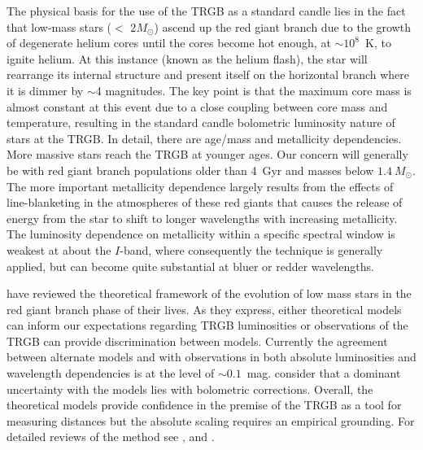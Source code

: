 \documentclass[twocolumn]{aastex62}
\begin{document}
The physical basis for the use of the TRGB as a standard candle lies in the fact that low-mass stars ($<$ 2$M_\odot$) ascend up the red giant branch due to the growth of degenerate helium cores until the cores become hot enough, at $\sim 10^8$~K, to ignite helium. At this instance (known as the helium flash), the star will rearrange its internal structure and present itself on the horizontal branch where it is dimmer by $\sim$4 magnitudes. The key point is that the maximum core mass is almost constant at this event due to a close coupling between core mass and temperature, resulting in the standard candle bolometric luminosity nature of stars at the TRGB. In detail, there are age/mass and metallicity dependencies. More massive stars reach the TRGB at younger ages. Our concern will generally be with red giant branch populations older than 4~Gyr and masses below $1.4~M_{\odot}$.  The more important metallicity dependence largely results from the effects of line-blanketing in the atmospheres of these red giants that causes the release of energy from the star to shift to longer wavelengths with increasing metallicity. The luminosity dependence on metallicity within a specific spectral window is weakest at about the $I$-band, where consequently the technique is generally applied, but can become quite substantial at bluer or redder wavelengths. 



\citet{2017A&A...606A..33S} have reviewed the theoretical framework of the evolution of low mass stars in the red giant branch phase of their lives.  As they express, either theoretical models can inform our expectations regarding TRGB luminosities or observations of the TRGB can provide discrimination between models.  Currently the agreement between alternate models and with observations in both absolute luminosities and wavelength dependencies is at the level of $\sim 0.1$~mag.  \citet{2017A&A...606A..33S} consider that a dominant uncertainty with the models lies with bolometric corrections.  Overall, the theoretical models provide confidence in the premise of the TRGB as a tool for measuring distances but the absolute scaling requires an empirical grounding.
For detailed reviews of the method see \citet{2005essp.book.....S},  \cite{2018SSRv..214..113B} and \cite{2021arXiv210402649A}.
\end{document}
